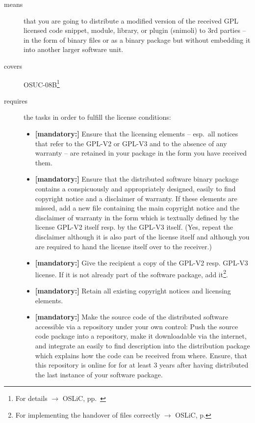 \begin{description}
\item[means] that you are going to distribute a modified version of the received
GPL licensed code snippet, module, library, or plugin (snimoli) to 3rd parties
-- in the form of binary files or as a binary package but without embedding it
into another larger software unit.
\item[covers] OSUC-08B\footnote{For details $\rightarrow$ OSLiC, pp.\
\pageref{OSUC-08B-DEF}}
\item[requires] the tasks in order to fulfill the license conditions:
\begin{itemize}

  \item \textbf{[mandatory:]} Ensure that the licensing elements -- esp.\ all
  notices that refer to the GPL-V2 or GPL-V3 and to the absence of any
  warranty -- are retained in your package in the form you have received them.

  \item \textbf{[mandatory:]} Ensure that the distributed software binary
  package contains a conspicuously and appropriately designed, easily to find
  copyright notice and a disclaimer of warranty. If these elements are missed,
  add a new file containing the main copyright notice and the disclaimer of
  warranty in the form which is textually defined by the license GPL-V2 itself
  resp. by the GPL-V3 itself. (Yes, repeat the disclaimer although it is also
  part of the license itself and although you are required to hand the license
  itself over to the receiver.)
  
  \item \textbf{[mandatory:]} Give the recipient a copy of the GPL-V2 resp.
  GPL-V3 license. If it is not already part of the software package, add
  it\footnote{For implementing the handover of files correctly $\rightarrow$
  OSLiC, p. \pageref{DistributingFilesHint}}.
  
  \item \textbf{[mandatory:]} Retain all existing copyright notices and
  licensing elements.

  \item \textbf{[mandatory:]} Make the source code of the distributed software
  accessible via a repository under your own control: Push the source code
  package into a repository, make it downloadable via the internet, and
  integrate an easily to find description into the distribution package which
  explains how the code can be received from where. Ensure, that this repository
  is online for for at least 3 years after having distributed the last instance
  of your software package.
  

\end{itemize}
\end{description}
